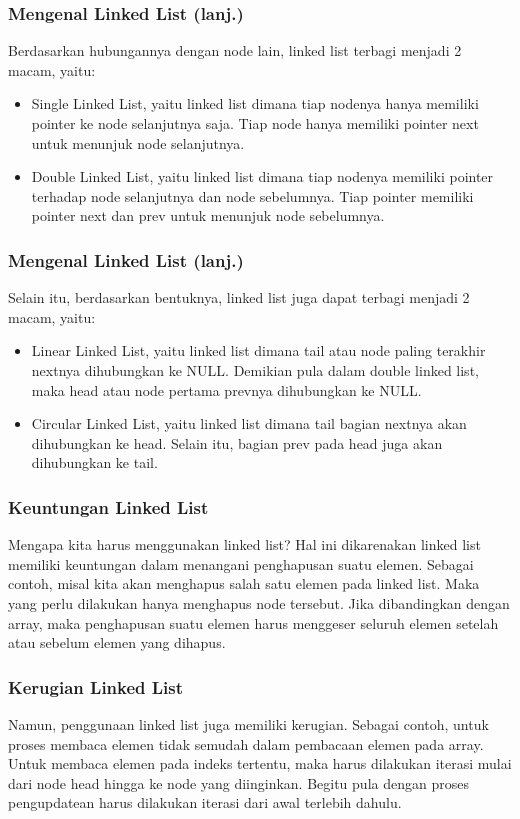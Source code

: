 \begin{frame}
\frametitle{Mengenal Linked List (lanj.)}
Berdasarkan hubungannya dengan node lain, linked list terbagi menjadi 2 macam, yaitu:
\begin{itemize}
	\item Single Linked List, yaitu linked list dimana tiap nodenya hanya memiliki pointer ke node selanjutnya saja. Tiap node hanya memiliki pointer \alert{next} untuk menunjuk node selanjutnya.
	\item Double Linked List, yaitu linked list dimana tiap nodenya memiliki pointer terhadap node selanjutnya dan node sebelumnya. Tiap pointer memiliki pointer next dan \alert{prev} untuk menunjuk node sebelumnya.
\end{itemize}
\end{frame}

\begin{frame}
\frametitle{Mengenal Linked List (lanj.)}
Selain itu, berdasarkan bentuknya, linked list juga dapat terbagi menjadi 2 macam, yaitu:
\begin{itemize}
	\item Linear Linked List, yaitu linked list dimana \alert{tail} atau node paling terakhir nextnya dihubungkan ke \alert{NULL}. Demikian pula dalam double linked list, maka \alert{head} atau node pertama prevnya dihubungkan ke NULL.
	\item Circular Linked List, yaitu linked list dimana tail bagian nextnya akan dihubungkan ke head. Selain itu, bagian prev pada head juga akan dihubungkan ke tail. 
\end{itemize}
\end{frame}

\begin{frame}
\frametitle{Keuntungan Linked List}
Mengapa kita harus menggunakan linked list? Hal ini dikarenakan linked list memiliki keuntungan dalam menangani penghapusan suatu elemen. Sebagai contoh, misal kita akan menghapus salah satu elemen pada linked list. Maka yang perlu dilakukan hanya menghapus node tersebut. Jika dibandingkan dengan array, maka penghapusan suatu elemen harus menggeser seluruh elemen setelah atau sebelum elemen yang dihapus.
\end{frame}

\begin{frame}
\frametitle{Kerugian Linked List}
Namun, penggunaan linked list juga memiliki kerugian. Sebagai contoh, untuk proses membaca elemen tidak semudah dalam pembacaan elemen pada array. Untuk membaca elemen pada indeks tertentu, maka harus dilakukan iterasi mulai dari node head hingga ke node yang diinginkan. Begitu pula dengan proses pengupdatean harus dilakukan iterasi dari awal terlebih dahulu.
\end{frame}

